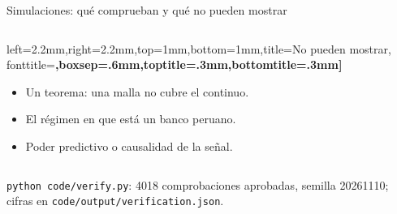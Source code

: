\documentclass[aspectratio=169,10pt,t]{beamer}
\newcommand{\source}[1]{\par\vfill{\fontsize{6}{7.2}\selectfont\color{soft}#1\par}}
\begin{document}
\begin{frame}{Simulaciones: qué comprueban y qué no pueden mostrar}
\begin{columns}[T,onlytextwidth]
\begin{tcolorbox}
  left=2.2mm,right=2.2mm,top=1mm,bottom=1mm,title={No pueden mostrar},
  fonttitle=\bfseries\small,boxsep=.6mm,toptitle=.3mm,bottomtitle=.3mm]
\footnotesize
\begin{itemize}\setlength{\itemsep}{.3mm}
\item Un teorema: una malla no cubre el continuo.
\item El régimen en que está un banco peruano.
\item Poder predictivo o causalidad de la señal.
\end{itemize}
\end{tcolorbox}
\end{columns}
\source{\texttt{python code/verify.py}: 4018 comprobaciones aprobadas, semilla 20261110;
cifras en \texttt{code/output/verification.json}.}
\end{frame}
\end{document}
